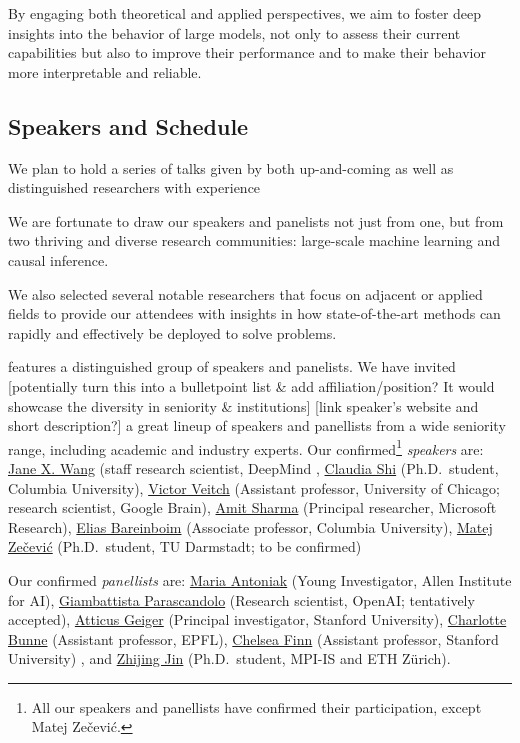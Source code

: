 \documentclass{article}
\begin{document}
By engaging both theoretical and applied perspectives, we aim to foster deep insights into the behavior of large models, not only to assess their current capabilities but also to improve their performance and to make their behavior more interpretable and reliable.



\subsection{Speakers and Schedule}


We plan to hold a series of talks given by both up-and-coming as well as distinguished researchers with experience

We are fortunate to draw our speakers and panelists not just from one, but from two thriving and diverse research communities: large-scale machine learning and causal inference.

We also selected several notable researchers that focus on adjacent or applied fields to provide our attendees with insights in how state-of-the-art methods can rapidly and effectively be deployed to solve problems.

features a distinguished group of speakers and panelists. 
We have invited {\color{blue} [potentially turn this into a bulletpoint list \& add affiliation/position? It would showcase the diversity in seniority \& institutions]}  
{\color{green} [link speaker's website and short description?]}
a great lineup of speakers and panellists from a wide seniority range, including academic and industry experts.
Our confirmed\footnote{All our speakers and panellists have confirmed their participation, except Matej Zečević.} \textit{speakers} are: \href{https://www.janexwang.com/}{Jane X. Wang} (staff research scientist, DeepMind ,
\href{https://www.claudiajshi.com/}{Claudia Shi} (Ph.D.\ student, Columbia University),
\href{http://victorveitch.com/}{Victor Veitch} (Assistant professor, University of Chicago; research scientist, Google Brain),
\href{https://amitsharma.in/}{Amit Sharma} (Principal researcher, Microsoft Research),
\href{https://causalai.net/}{Elias Bareinboim} (Associate professor, Columbia University), \href{https://www.matej-zecevic.de/}{Matej Zečević} (Ph.D.\ student, TU Darmstadt; to be confirmed)

Our confirmed \textit{panellists} are:
\href{https://maria-antoniak.github.io/}{Maria Antoniak} (Young Investigator, Allen Institute for AI),
\href{https://sites.google.com/view/giambattista-parascandolo/home}{Giambattista Parascandolo} (Research scientist, OpenAI; tentatively accepted),
\href{https://atticusg.github.io/}{Atticus Geiger} (Principal investigator, Stanford University),
\href{https://www.bunnelab.com/}{Charlotte Bunne} (Assistant professor, EPFL),
\href{https://ai.stanford.edu/~cbfinn/}{Chelsea Finn} (Assistant professor, Stanford University) , and
\href{https://zhijing-jin.com/}{Zhijing Jin} (Ph.D.\ student, MPI-IS and ETH Zürich).
\end{document}
